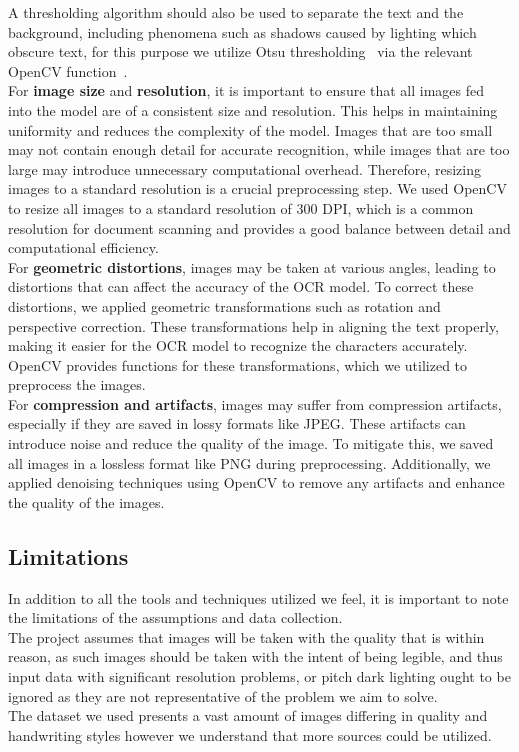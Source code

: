 \documentclass[twoside,a4paper]{article}
\begin{document}
A thresholding algorithm should also be used to separate the text and the background, including phenomena such as shadows caused by lighting which obscure text, for this purpose we utilize Otsu thresholding~\cite{Tensmeyer2015} via the relevant OpenCV function~\cite{OpenCVThresholding}.
\\
For \textbf{image size} and \textbf{resolution}, it is important to ensure that all images fed into the model are of a consistent size and resolution. This helps in maintaining uniformity and reduces the complexity of the model. Images that are too small may not contain enough detail for accurate recognition, while images that are too large may introduce unnecessary computational overhead. Therefore, resizing images to a standard resolution is a crucial preprocessing step. We used OpenCV to resize all images to a standard resolution of 300 DPI, which is a common resolution for document scanning and provides a good balance between detail and computational efficiency.
\\
For \textbf{geometric distortions}, images may be taken at various angles, leading to distortions that can affect the accuracy of the OCR model. To correct these distortions, we applied geometric transformations such as rotation and perspective correction. These transformations help in aligning the text properly, making it easier for the OCR model to recognize the characters accurately. OpenCV provides functions for these transformations, which we utilized to preprocess the images.
\\
For \textbf{compression and artifacts}, images may suffer from compression artifacts, especially if they are saved in lossy formats like JPEG. These artifacts can introduce noise and reduce the quality of the image. To mitigate this, we saved all images in a lossless format like PNG during preprocessing. Additionally, we applied denoising techniques using OpenCV to remove any artifacts and enhance the quality of the images.


\subsection{Limitations}
In addition to all the tools and techniques utilized we feel, it is important to note the limitations of the assumptions and data collection.\\
The project assumes that images will be taken with the quality that is within reason, as such images should be taken with the intent of being legible, and thus input data with significant resolution problems, or pitch dark lighting ought to be ignored as they are not representative of the problem we aim to solve.\\
The dataset we used presents a vast amount of images differing in quality and handwriting styles however we understand that more sources could be utilized.\\

\printbibliography
\end{document}
